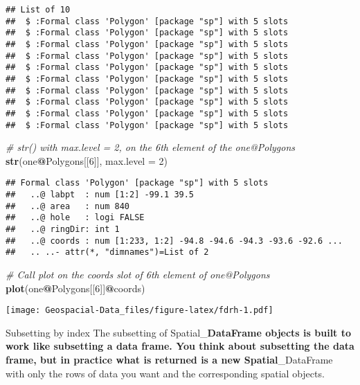 \documentclass[]{article}
\newenvironment{Shaded}{\begin{snugshade}}{\end{snugshade}}
\newcommand{\CommentTok}[1]{\textcolor[rgb]{0.56,0.35,0.01}{\textit{#1}}}
\newcommand{\DataTypeTok}[1]{\textcolor[rgb]{0.13,0.29,0.53}{#1}}
\newcommand{\DecValTok}[1]{\textcolor[rgb]{0.00,0.00,0.81}{#1}}
\newcommand{\KeywordTok}[1]{\textcolor[rgb]{0.13,0.29,0.53}{\textbf{#1}}}
\newcommand{\NormalTok}[1]{#1}
\newcommand{\OperatorTok}[1]{\textcolor[rgb]{0.81,0.36,0.00}{\textbf{#1}}}
\begin{document}
\begin{verbatim}
## List of 10
##  $ :Formal class 'Polygon' [package "sp"] with 5 slots
##  $ :Formal class 'Polygon' [package "sp"] with 5 slots
##  $ :Formal class 'Polygon' [package "sp"] with 5 slots
##  $ :Formal class 'Polygon' [package "sp"] with 5 slots
##  $ :Formal class 'Polygon' [package "sp"] with 5 slots
##  $ :Formal class 'Polygon' [package "sp"] with 5 slots
##  $ :Formal class 'Polygon' [package "sp"] with 5 slots
##  $ :Formal class 'Polygon' [package "sp"] with 5 slots
##  $ :Formal class 'Polygon' [package "sp"] with 5 slots
##  $ :Formal class 'Polygon' [package "sp"] with 5 slots
\end{verbatim}

\begin{Shaded}
\begin{Highlighting}[]
\CommentTok{# str() with max.level = 2, on the 6th element of the one@Polygons}
\KeywordTok{str}\NormalTok{(one}\OperatorTok{@}\NormalTok{Polygons[[}\DecValTok{6}\NormalTok{]], }\DataTypeTok{max.level =} \DecValTok{2}\NormalTok{)}
\end{Highlighting}
\end{Shaded}

\begin{verbatim}
## Formal class 'Polygon' [package "sp"] with 5 slots
##   ..@ labpt  : num [1:2] -99.1 39.5
##   ..@ area   : num 840
##   ..@ hole   : logi FALSE
##   ..@ ringDir: int 1
##   ..@ coords : num [1:233, 1:2] -94.8 -94.6 -94.3 -93.6 -92.6 ...
##   .. ..- attr(*, "dimnames")=List of 2
\end{verbatim}

\begin{Shaded}
\begin{Highlighting}[]
\CommentTok{# Call plot on the coords slot of 6th element of one@Polygons}
\KeywordTok{plot}\NormalTok{(one}\OperatorTok{@}\NormalTok{Polygons[[}\DecValTok{6}\NormalTok{]]}\OperatorTok{@}\NormalTok{coords)}
\end{Highlighting}
\end{Shaded}

\texttt{[image: Geospacial-Data\_files/figure-latex/fdrh-1.pdf]}

Subsetting by index The subsetting of Spatial\_\textbf{DataFrame objects
is built to work like subsetting a data frame. You think about
subsetting the data frame, but in practice what is returned is a new
Spatial}\_DataFrame with only the rows of data you want and the
corresponding spatial objects.
\end{document}
